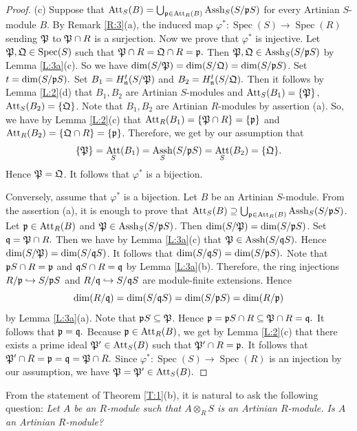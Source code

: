 \documentclass[a4papersize]{article}
\DeclareMathOperator{\Assh}{Assh}
\DeclareMathOperator{\Att}{Att}
\DeclareMathOperator{\Spec}{Spec}
\begin{document}
{\begin{proof}
(c) Suppose that $\Att_S(B)=\bigcup_{\frak p\in\Att_R(B)}\Assh_S(S/\frak pS)$ for every Artinian $S$-module $B$. By Remark \ref{R:3}(a), the induced map $\varphi^*:\Spec(S)\to\Spec(R)$ sending 
$\frak P$ to $\frak P\cap R$ is a surjection. Now we prove that $\varphi^*$ is injective. Let  
$\frak P, \frak Q\in\Spec(S)$ such that $\frak P\cap R=\frak Q\cap R=\frak p.$ Then $\frak P, \frak Q\in\Assh_S(S/\frak pS)$ by Lemma \ref{L:3a}(c). So we have $\dim(S/\frak P)=\dim(S/\frak Q)=\dim(S/\frak pS)$. Set $t=\dim(S/\frak pS).$ Set $B_1=H^t_{\frak n}(S/\frak P)$ and $B_2=H^t_{\frak n}(S/\frak Q).$ Then it follows by Lemma \ref{L:2}(d) that $B_1, B_2$ are Artinian $S$-modules and $\Att_S(B_1)=\{\frak P\}$,  $\Att_S(B_2)=\{\frak Q\}$. Note that $B_1, B_2$ are Artinian $R$-modules by assertion (a). So, we have by Lemma \ref{L:2}(c) that  
$\Att_R(B_1)=\{\frak P\cap R\}=\{\frak p\}$ and $\Att_R(B_2)=\{\frak Q\cap R\}=\{\frak p\}$. Therefore, we get by our assumption that 
$$\{\frak P\}=\Att_S(B_1)=\Assh_S(S/\frak pS)=\Att_S(B_2)=\{\frak Q\}.$$ 
Hence $\frak P=\frak Q$. It follows that $\varphi^*$ is a bijection.
	
Conversely, assume that $\varphi^*$ is a bijection. Let $B$ be an Artinian $S$-module. From the assertion (a),  it is enough to prove that $\Att_S(B)\supseteq \bigcup_{\frak p\in\Att_R(B)}\Assh_S(S/\frak pS)$. Let $\frak p\in \Att_R(B)$ and $\frak P\in\Assh_S(S/\frak pS)$. Then $\dim(S/\frak P)=\dim(S/\frak pS)$. Set $\frak q=\frak P\cap R.$ Then we have by Lemma \ref{L:3a}(c) that $\frak P\in\Assh(S/\frak qS).$ Hence $\dim(S/\frak P)=\dim(S/\frak qS)$. It follows that $\dim(S/\frak qS)=\dim(S/\frak pS).$ Note that $\frak pS\cap R=\frak p$ and $\frak qS\cap R=\frak q$ by Lemma \ref{L:3a}(b). Therefore, the ring injections $R/\frak p\hookrightarrow S/\frak pS$ and $R/\frak q\hookrightarrow S/\frak qS$ are module-finite extensions. Hence 
$$\dim (R/\frak q)=\dim(S/\frak qS)=\dim(S/\frak pS)=\dim (R/\frak p)$$ 
by Lemma \ref{L:3a}(a).	Note that $\frak pS\subseteq \frak P$. Hence  $\frak p=\frak pS\cap R\subseteq \frak P\cap R=\frak q.$   It follows that $\frak p=\frak q.$ Because $\frak p\in\Att_R(B)$, we get by Lemma \ref{L:2}(c) that there exists a prime ideal $\frak P'\in \Att_S(B)$ such that $\frak P'\cap R=\frak p.$ It follows that  $\frak P'\cap R=\frak p=\frak q=\frak P\cap R.$ Since $\varphi^*: \Spec(S)\to \Spec(R)$ is an injection by our assumption, we have $\frak P=\frak P'\in\Att_S(B).$ 
\end{proof}
	 
From the statement of Theorem \ref{T:1}(b), it is natural to ask the following question:  {\it Let $A$ be an $R$-module such that $A\otimes_RS$ is an Artinian $R$-module. Is $A$ an Artinian $R$-module?}
 
}
\end{document}
